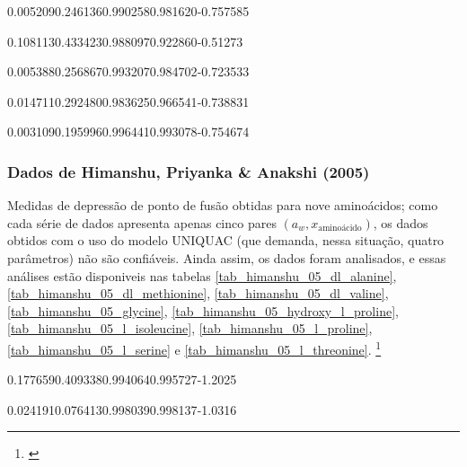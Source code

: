 %
	{0.005209}{0.246136}{0.990258}{0.981620}{-0.757585}

%
	{0.108113}{0.433423}{0.988097}{0.922860}{-0.51273}

%
	{0.005388}{0.256867}{0.993207}{0.984702}{-0.723533}

%
	{0.014711}{0.292480}{0.983625}{0.966541}{-0.738831}

%
	{0.003109}{0.195996}{0.996441}{0.993078}{-0.754674}

\FloatBarrier

\subsubsection{Dados de Himanshu, Priyanka \& Anakshi (2005)}

Medidas de depressão de ponto de fusão obtidas para nove aminoácidos;
como cada série de dados apresenta apenas cinco pares $(a_w,x_\text{aminoácido})$,
os dados obtidos com o uso do modelo UNIQUAC (que demanda, nessa situação,
quatro parâmetros) não são confiáveis. Ainda assim, os dados foram analisados,
e essas análises estão disponiveis nas tabelas \ref{tab_himanshu_05_dl_alanine},
\ref{tab_himanshu_05_dl_methionine}, \ref{tab_himanshu_05_dl_valine},
\ref{tab_himanshu_05_glycine}, \ref{tab_himanshu_05_hydroxy_l_proline},
\ref{tab_himanshu_05_l_isoleucine}, \ref{tab_himanshu_05_l_proline},
\ref{tab_himanshu_05_l_serine} e \ref{tab_himanshu_05_l_threonine}.
\footnote{\cite{himanshu2005}}

%
	{0.177659}{0.409338}{0.994064}{0.995727}{-1.2025}

%
	{0.024191}{0.076413}{0.998039}{0.998137}{-1.0316}

